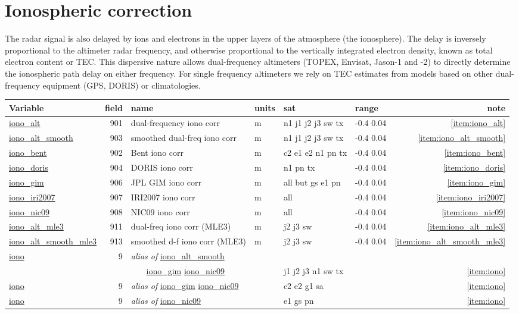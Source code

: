 \documentclass[a4paper,11pt,openany,natbib,nomargin]{thesis}
\makeatletter
\newcommand\var[1]{\url{#1}\index{variables!#1@\protect\url{#1}}}
\newcommand\alias[1]{\emph{alias of} \var{#1}}
\newenvironment{vartable}{
\begin{table}[ht]
\small
\begin{tabular}{lrllllr}
\hline
Variable & field & name & units & sat & range & note \\
\hline
}{
\hline
\end{tabular}
\end{table}
}
\makeatother
\begin{document}
\section{Ionospheric correction}
The radar signal is also delayed by ions and electrons in the upper layers of the atmosphere (the ionosphere). The delay is inversely proportional to the altimeter radar frequency, and otherwise proportional to the vertically integrated electron density, known as total electron content or TEC. This dispersive nature allows dual-frequency altimeters (TOPEX, Envisat, Jason-1 and -2) to directly determine the ionospheric path delay on either frequency. For single frequency altimeters we rely on TEC estimates from models based on other dual-frequency equipment (GPS, DORIS) or climatologies.

\begin{vartable}
\var{iono_alt} & 901 & dual-frequency iono corr & m & n1 j1 j2 j3 sw tx & -0.4 0.04 & \ref{item:iono_alt} \\
\var{iono_alt_smooth} & 903 & smoothed dual-freq iono corr & m & n1 j1 j2 j3 sw tx & -0.4 0.04 & \ref{item:iono_alt_smooth} \\
\var{iono_bent} & 902 & Bent iono corr & m & c2 e1 e2 n1 pn tx & -0.4 0.04 & \ref{item:iono_bent} \\
\var{iono_doris} & 904 & DORIS iono corr & m & n1 pn tx & -0.4 0.04 & \ref{item:iono_doris} \\
\var{iono_gim} & 906 & JPL GIM iono corr & m & all but gs e1 pn & -0.4 0.04 & \ref{item:iono_gim} \\
\var{iono_iri2007} & 907 & IRI2007 iono corr & m & all & -0.4 0.04 & \ref{item:iono_iri2007} \\
\var{iono_nic09} & 908 & NIC09 iono corr & m & all & -0.4 0.04 & \ref{item:iono_nic09} \\
\var{iono_alt_mle3} & 911 & dual-freq iono corr (MLE3) & m & j2 j3 sw & -0.4 0.04 & \ref{item:iono_alt_mle3} \\
\var{iono_alt_smooth_mle3} & 913 & smoothed d-f iono corr (MLE3) & m & j2 j3 sw & -0.4 0.04 & \ref{item:iono_alt_smooth_mle3} \\
\hline
\var{iono} & 9 & \alias{iono_alt_smooth} & &  &&  \\
& & ~~~ \var{iono_gim} \var{iono_nic09} & & j1 j2 j3 n1 sw tx && \ref{item:iono} \\
\var{iono} & 9 & \alias{iono_gim} \var{iono_nic09} & & c2 e2 g1 sa && \ref{item:iono} \\
\var{iono} & 9 & \alias{iono_nic09} & & e1 gs pn && \ref{item:iono} \\
\end{vartable}
\end{document}
